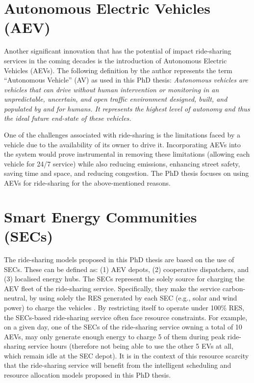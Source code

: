 \section{Autonomous Electric Vehicles (AEV)}
\label{sec:aevs}
Another significant innovation that has the potential of impact ride-sharing services in the coming decades is the introduction of Autonomous Electric Vehicles (AEVs). 
The following definition by the author \cite{fagnant2014future} represents the term “Autonomous Vehicle” (AV) as used in this PhD thesis:
\textit{Autonomous vehicles are vehicles that can drive without human intervention or monitoring in an unpredictable, uncertain, and open traﬃc environment designed, built, and populated by and for humans. It represents the highest level of autonomy and thus the ideal future end-state of these vehicles.} 

One of the challenges associated with ride-sharing is the limitations faced by a vehicle due to the availability of its owner to drive it. Incorporating AEVs into the system would prove instrumental in removing these limitations (allowing each vehicle for 24/7 service) while also reducing emissions, enhancing street safety, saving time and space, and reducing congestion. The PhD thesis focuses on using AEVs for ride-sharing for the above-mentioned reasons.

\section{Smart Energy Communities (SECs)}
\label{sec:secs}

The ride-sharing models proposed in this PhD thesis are based on the use of SECs. These can be defined as: (1) AEV depots, (2) cooperative dispatchers, and (3) localised energy hubs. The SECs represent the solely source for charging the AEV fleet of the ride-sharing service. Specifically, they make the service carbon-neutral, by using solely the RES generated by each SEC (e.g., solar and wind power) to charge the vehicles \cite{paranjape2020urban}. By restricting itself to operate under 100\% RES, the SECs-based ride-sharing service often face resource constraints. For example, on a given day, one of the SECs of the ride-sharing service owning a total of 10 AEVs, may only generate enough energy to charge 5 of them during peak ride-sharing service hours (therefore not being able to use the other 5 EVs at all, which remain idle at the SEC depot). It is in the context of this resource scarcity that the ride-sharing service will benefit from the intelligent scheduling and resource allocation models proposed in this PhD thesis.

